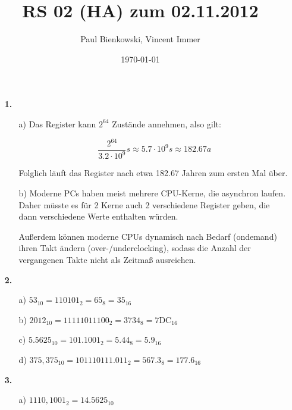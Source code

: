 \documentclass[a4paper,10pt]{scrartcl}
\author{Paul Bienkowski, Vincent Immer}
\title{RS 02 (HA) zum 02.11.2012}
\date{\today}
\begin{document}
\setcounter{secnumdepth}{0}
\maketitle

\begin{enumerate}
    \item[\textbf{1.}]
        \begin{enumerate}
            \item[a)]
                Das Register kann $2^{64}$ Zustände annehmen, also gilt:

                $$\frac{2^{64}}{3.2 \cdot 10^9} s \approx 5.7 \cdot 10^9 s \approx 182.67 a$$

                Folglich läuft das Register nach etwa 182.67 Jahren zum ersten Mal über.

            \item[b)]
                Moderne PCs haben meist mehrere CPU-Kerne, die asynchron laufen. Daher müsste es für 2 Kerne auch 2 verschiedene Register
                geben, die dann verschiedene Werte enthalten würden.

                Außerdem können moderne CPUs dynamisch nach Bedarf (ondemand) ihren Takt ändern (over-/underclocking), sodass die Anzahl der
                vergangenen Takte nicht als Zeitmaß ausreichen.
        \end{enumerate}

    \item[\textbf{2.}]
        \begin{enumerate}
            \item[a)]
                $53_{10} = 110101_2 = 65_8 = 35_{16}$

            \item[b)]
                $2012_{10} = 11111011100_2 = 3734_8 = \text{7DC}_{16}$

            \item[c)]
                $5.5625_{10} = 101.1001_2 = 5.44_8 = 5.9_{16}$

            \item[d)]
                $375,375_{10} = 101110111.011_2 = 567.3_8 = 177.6_{16}$
        \end{enumerate}

    \item[\textbf{3.}]
        \begin{enumerate}
            \item[a)]
                $1110,1001_2 = 14.5625_{10}$


\end{enumerate}
\end{enumerate}
\end{document}
